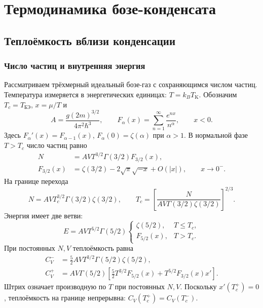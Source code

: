 \documentclass[../final.tex]{subfiles}
\begin{document}
\ifSubfilesClassLoaded{\setcounter{chapter}{3}}{}

\chapter{Термодинамика бозе-конденсата}
\section{Теплоёмкость вблизи конденсации}
\subsection{Число частиц и внутренняя энергия}
Рассматриваем трёхмерный идеальный бозе-газ с сохраняющимся числом частиц.
Температура измеряется в энергетических единицах: $T=k_BT_{\mathrm K}$.
Обозначим $T_c=T_{\text{БЭ}}$, $x=\mu/T$ и
\begin{equation*}
 A=\frac{g(2m)^{3/2}}{4\pi^2\hbar^3},\qquad
 F_\alpha(x)=\sum_{n=1}^{\infty}\frac{e^{nx}}{n^\alpha},\qquad x<0.
\end{equation*}
Здесь $F_\alpha'(x)=F_{\alpha-1}(x)$,
$F_\alpha(0)=\zeta(\alpha)$ при $\alpha>1$.
В нормальной фазе $T>T_c$ число частиц равно
\begin{align*}
 N&=AVT^{3/2}\Gamma(3/2)F_{3/2}(x),\\
 F_{3/2}(x)&=\zeta(3/2)-2\sqrt\pi\sqrt{-x}+O(|x|),\qquad x\to0^-.
\end{align*}
На границе перехода
\begin{equation*}
 N=AVT_c^{3/2}\Gamma(3/2)\zeta(3/2),\qquad
 T_c=\left[\frac{N}{AV\Gamma(3/2)\zeta(3/2)}\right]^{2/3}.
\end{equation*}
Энергия имеет две ветви:
\begin{equation*}
 E=AVT^{5/2}\Gamma(5/2)
 \begin{cases}
  \zeta(5/2),&T\leq T_c,\\
  F_{5/2}(x),&T>T_c.
 \end{cases}
\end{equation*}
При постоянных $N,V$ теплоёмкость равна
\begin{align*}
 C_V^-&=\frac52AVT^{3/2}\Gamma(5/2)\zeta(5/2),\\
 C_V^+&=AV\Gamma(5/2)
 \left[\frac52T^{3/2}F_{5/2}(x)+T^{5/2}F_{3/2}(x)x'\right].
\end{align*}
Штрих означает производную по $T$ при постоянных $N,V$.
Поскольку $x'(T_c^+)=0$, теплоёмкость на границе непрерывна:
$C_V(T_c^+)=C_V(T_c^-)$.
\end{document}
